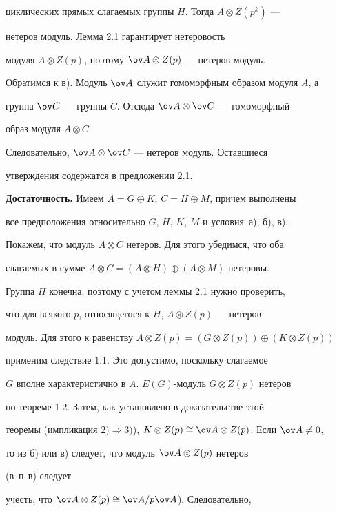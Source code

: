 \begin{pf}
циклических прямых слагаемых группы $H$. Тогда $A\otimes Z(p^k)$ --- 


нетеров модуль. Лемма 2.1 гарантирует нетеровость 


модуля $A\otimes Z(p)$, поэтому $\ov A\otimes Z(p)$ --- нетеров модуль. 


 


Обратимся к в). Модуль $\ov A$ служит гомоморфным образом модуля $A$, а 


группа $\ov C$ --- группы $C$. Отсюда $\ov A\otimes\ov C$ --- гомоморфный 


образ модуля $A\otimes C$. 


Следовательно, $\ov A\otimes\ov C$ --- нетеров модуль. Оставшиеся 


утверждения содержатся в предложении 2.1. 


 


{\bf Достаточность.} Имеем $A=G\oplus K$, $C=H\oplus M$, причем выполнены 


все предположения относительно $G$, $H$, $K$, $M$ и условия~а), б), в). 


Покажем, что модуль $A\otimes C$ нетеров. Для этого убедимся, что оба 


слагаемых в сумме $A\otimes C=(A\otimes H)\oplus(A\otimes M)$ нетеровы. 


 


Группа $H$ конечна, поэтому с учетом леммы 2.1 нужно проверить, 


что для всякого $p$, относящегося к $H$, $A\otimes Z(p)$ --- нетеров 


модуль. Для этого к равенству $A\otimes Z(p)=(G\otimes 


Z(p))\oplus(K\otimes Z(p))$ 


применим следствие 1.1. Это допустимо, поскольку слагаемое 


$G$ вполне характеристично в $A$.\; $E(G)$-модуль $G\otimes Z(p)$ нетеров 


по теореме 1.2. Затем, как установлено в доказательстве этой 


теоремы (импликация $2)\Rightarrow 3)$), $K\otimes Z(p)\cong\ov A\otimes 


Z(p)$. Если $\ov A\ne0$, 


то из б) или в) следует, что модуль $\ov A\otimes Z(p)$ нетеров 


(в~п.\,в) следует


учесть, что $\ov A\otimes Z(p)\cong\ov A/p\ov A$). Следовательно, 



\end{pf}
